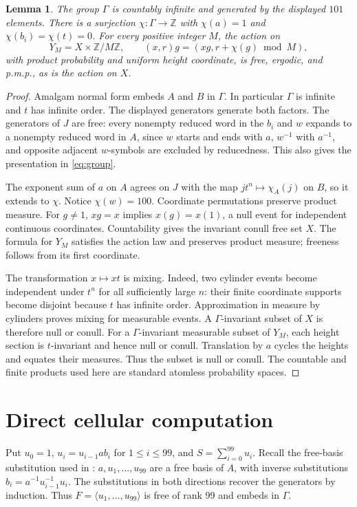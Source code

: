 \documentclass[11pt]{article}
\newcommand{\ZZ}{\mathbb Z}
\newtheorem{lemma}[theorem]{Lemma}
\theoremstyle{remark}\newtheorem{remark}[theorem]{Remark}
\begin{document}
\begin{lemma}\label{lem:actions}
The group $\Gamma$ is countably infinite and generated by the displayed $101$ elements. There is a surjection $\chi:\Gamma\to\ZZ$ with $\chi(a)=1$ and $\chi(b_i)=\chi(t)=0$. For every positive integer $M$, the action on
\[
 Y_M=X\times\ZZ/M\ZZ,\qquad
 (x,r)g=(xg,r+\chi(g)\bmod M),
\]
with product probability and uniform height coordinate, is free, ergodic, and p.m.p., as is the action on $X$.
\end{lemma}
\begin{proof}
Amalgam normal form embeds $A$ and $B$ in $\Gamma$. In particular $\Gamma$ is infinite and $t$ has infinite order. The displayed generators generate both factors. The generators of $J$ are free: every nonempty reduced word in the $b_i$ and $w$ expands to a nonempty reduced word in $A$, since $w$ starts and ends with $a$, $w^{-1}$ with $a^{-1}$, and opposite adjacent $w$-symbols are excluded by reducedness. This also gives the presentation in \eqref{eq:group}.

The exponent sum of $a$ on $A$ agrees on $J$ with the map $jt^n\mapsto\chi_A(j)$ on $B$, so it extends to $\chi$. Notice $\chi(w)=100$. Coordinate permutations preserve product measure. For $g\neq1$, $xg=x$ implies $x(g)=x(1)$, a null event for independent continuous coordinates. Countability gives the invariant conull free set $X$. The formula for $Y_M$ satisfies the action law and preserves product measure; freeness follows from its first coordinate.

The transformation $x\mapsto xt$ is mixing. Indeed, two cylinder events become independent under $t^n$ for all sufficiently large $n$: their finite coordinate supports become disjoint because $t$ has infinite order. Approximation in measure by cylinders proves mixing for measurable events. A $\Gamma$-invariant subset of $X$ is therefore null or conull. For a $\Gamma$-invariant measurable subset of $Y_M$, each height section is $t$-invariant and hence null or conull. Translation by $a$ cycles the heights and equates their measures. Thus the subset is null or conull. The countable and finite products used here are standard atomless probability spaces.
\end{proof}

\section{Direct cellular computation}

Put $u_0=1$, $u_i=u_{i-1}ab_i$ for $1\leq i\leq99$, and $S=\sum_{i=0}^{99}u_i$. Recall the free-basis substitution used in \cite[\S5.2]{OAI:A-group-without-fixed-price-October-5-2026}: $a,u_1,\ldots,u_{99}$ are a free basis of $A$, with inverse substitutions $b_i=a^{-1}u_{i-1}^{-1}u_i$. The substitutions in both directions recover the generators by induction. Thus $F=\langle u_1,\ldots,u_{99}\rangle$ is free of rank $99$ and embeds in $\Gamma$.
\end{document}
